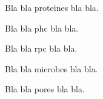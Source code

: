 \documentclass[french]{report}
\begin{document}
Bla bla \gls{proteines} bla bla.

Bla bla \gls{phc} bla bla.

Bla bla \gls{rpc} bla bla.

Bla bla \gls{microbes} bla bla.

Bla bla \gls{pores} bla bla.


\printglossary
\end{document}
